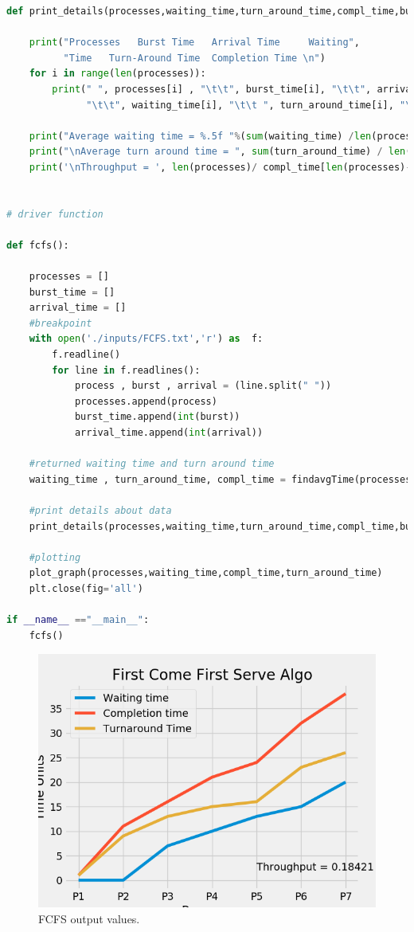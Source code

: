 \documentclass[11pt,a4paper]{report}
\begin{document}
\begin{lstlisting}[language=Python,caption=fcfs source code]
def print_details(processes,waiting_time,turn_around_time,compl_time,burst_time,arrival_time):
      
    print("Processes   Burst Time   Arrival Time     Waiting",  
          "Time   Turn-Around Time  Completion Time \n") 
    for i in range(len(processes)):
        print(" ", processes[i] , "\t\t", burst_time[i], "\t\t", arrival_time[i],  
              "\t\t", waiting_time[i], "\t\t ", turn_around_time[i], "\t\t ", compl_time[i])  
  
    print("Average waiting time = %.5f "%(sum(waiting_time) /len(processes))) 
    print("\nAverage turn around time = ", sum(turn_around_time) / len(processes))  
    print('\nThroughput = ', len(processes)/ compl_time[len(processes)-1])


# driver function

def fcfs():
 
    processes = []
    burst_time = []
    arrival_time = []
    #breakpoint
    with open('./inputs/FCFS.txt','r') as  f:
        f.readline()
        for line in f.readlines():
            process , burst , arrival = (line.split(" "))
            processes.append(process)
            burst_time.append(int(burst))
            arrival_time.append(int(arrival))

    #returned waiting time and turn around time
    waiting_time , turn_around_time, compl_time = findavgTime(processes,  burst_time, arrival_time)
    
    #print details about data
    print_details(processes,waiting_time,turn_around_time,compl_time,burst_time,arrival_time)

    #plotting 
    plot_graph(processes,waiting_time,compl_time,turn_around_time)
    plt.close(fig='all')

if __name__ =="__main__": 
    fcfs()
\end{lstlisting}

\begin{figure}[H]
	\centering
	\includegraphics[scale=0.8]{./img/FCFS_output.png}
	\caption{FCFS output values.}
\end{figure}
\end{document}
